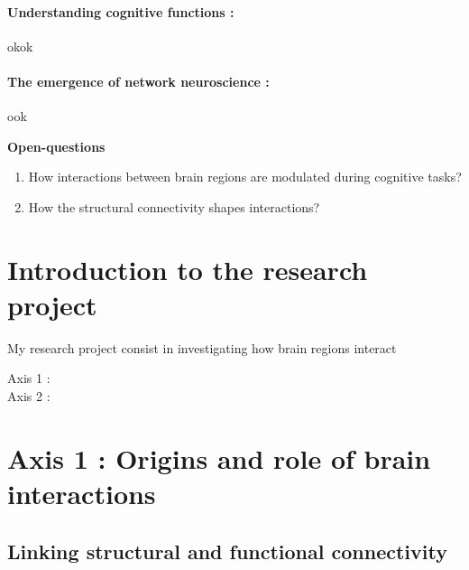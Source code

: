 \documentclass[a4paper,11pt]{article}
\begin{document}
\paragraph{Understanding cognitive functions :} okok

\paragraph{The emergence of network neuroscience :} ook

\begin{oquest}
    \textbf{Open-questions}
    \begin{enumerate}
        \item How interactions between brain regions are modulated during cognitive tasks?
        \item How the structural connectivity shapes interactions?
    \end{enumerate}
\end{oquest}

\section{Introduction to the research project}

\begin{bigpic}
    My research project consist in investigating how brain regions interact
    
    \begin{description}
        \item[{\large Axis 1} :]
        \item[{\large Axis 2} :]
    \end{description}
    
\end{bigpic}



\section{Axis 1 : Origins and role of brain interactions}

\subsection{Linking structural and functional connectivity}
\end{document}
